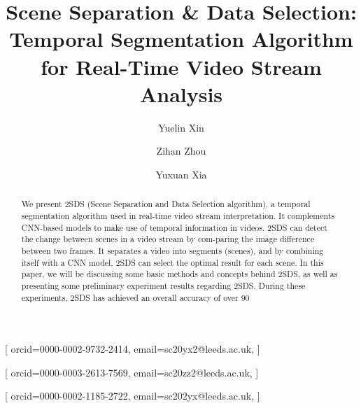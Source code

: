 \documentclass[
twocolumn,
]{ceurart}
\begin{document}


\title{Scene Separation \& Data Selection: Temporal Segmentation Algorithm for Real-Time Video Stream Analysis}


\author[1,2]{Yuelin Xin}[%
orcid=0000-0002-9732-2414,
email=sc20yx2@leeds.ac.uk,
]
\cormark[1]
\fnmark[1]
\address[1]{Southwest Jiaotong University, Chengdu, China}
\address[2]{University of Leeds, Leeds, UK}

\author[1,2]{Zihan Zhou}[%
orcid=0000-0003-2613-7569,
email=sc20zz2@leeds.ac.uk,
]
\fnmark[1]

\author[1,2]{Yuxuan Xia}[%
orcid=0000-0002-1185-2722,
email=sc202yx@leeds.ac.uk,
]
\fnmark[1]


\begin{abstract}
  We present 2SDS (Scene Separation and Data Selection algorithm), a temporal segmentation algorithm used in real-time video stream interpretation. It complements CNN-based models to make use of temporal information in videos. 2SDS can detect the change between scenes in a video stream by com-paring the image difference between two frames. It separates a video into segments (scenes), and by combining itself with a CNN model, 2SDS can select the optimal result for each scene.
In this paper, we will be discussing some basic methods and concepts behind 2SDS, as well as presenting some preliminary experiment results regarding 2SDS. During these experiments, 2SDS has achieved an overall accuracy of over 90%
\end{abstract}
\end{document}
